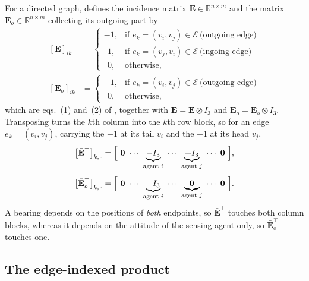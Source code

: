\documentclass[11pt,a4paper]{article}
\theoremstyle{plain}
\theoremstyle{definition}
\newcommand{\R}{\mathbb{R}}
\newcommand{\Ebar}{\bar{\mathbf{E}}}
\newcommand{\Ebaro}{\bar{\mathbf{E}}_o}
\begin{document}
For a directed graph, \cite{michieletto2021} defines the incidence matrix
$\mathbf E\in\R^{n\times m}$ and the matrix $\mathbf E_o\in\R^{n\times m}$
collecting its outgoing part by
\begin{equation}\label{eq:inc}
\begin{aligned}
  [\mathbf E]_{ik}&=
  \begin{cases}
    -1,&\text{if }e_k=(v_i,v_j)\in\mathcal E\ \text{(outgoing edge)}\\
    \ \ 1,&\text{if }e_k=(v_j,v_i)\in\mathcal E\ \text{(ingoing edge)}\\
    \ \ 0,&\text{otherwise,}
  \end{cases}\\[6pt]
  [\mathbf E_o]_{ik}&=
  \begin{cases}
    -1,&\text{if }e_k=(v_i,v_j)\in\mathcal E\ \text{(outgoing edge)}\\
    \ \ 0,&\text{otherwise,}
  \end{cases}
\end{aligned}
\end{equation}
which are eqs.~(1) and~(2) of \cite{michieletto2021}, together with
$\Ebar=\mathbf E\otimes I_3$ and $\Ebaro=\mathbf E_o\otimes I_3$. Transposing
turns the $k$th column into the $k$th row block, so for an edge
$e_k=(v_i,v_j)$, carrying the $-1$ at its tail $v_i$ and the $+1$ at its head
$v_j$,
\begin{align}
  \bigl[\Ebar^\top\bigr]_{k,\,\cdot}
  &=\Bigl[\ \mathbf 0\ \cdots\ \underbrace{-I_3}_{\text{agent }i}\ \cdots\
     \underbrace{+I_3}_{\text{agent }j}\ \cdots\ \mathbf 0\ \Bigr],
  \label{eq:Erow}\\[4pt]
  \bigl[\Ebaro^\top\bigr]_{k,\,\cdot}
  &=\Bigl[\ \mathbf 0\ \cdots\ \underbrace{-I_3}_{\text{agent }i}\ \cdots\
     \underbrace{\ \ \mathbf 0\ \ }_{\text{agent }j}\ \cdots\ \mathbf 0\ \Bigr].
  \label{eq:Eorow}
\end{align}
A bearing depends on the positions of \emph{both} endpoints, so $\Ebar^\top$
touches both column blocks, whereas it depends on the attitude of the sensing
agent only, so $\Ebaro^\top$ touches one.

\subsection*{The edge-indexed product}
\end{document}
